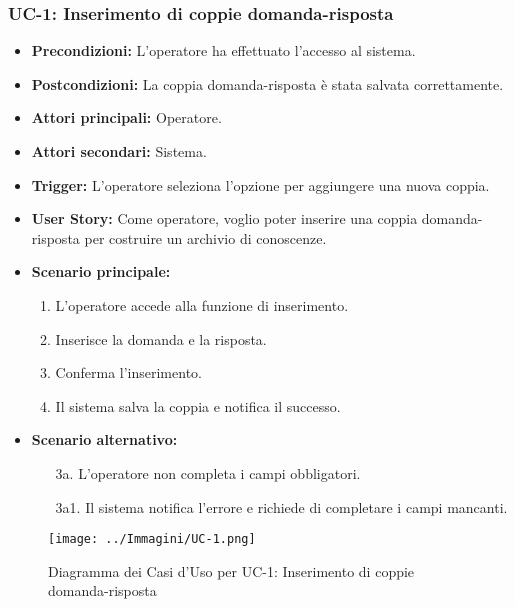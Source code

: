 \documentclass[a4paper, 12pt]{article}
\begin{document}
\subsubsection{UC-1: Inserimento di coppie domanda-risposta}
\begin{itemize}
    \item \textbf{Precondizioni:} L'operatore ha effettuato l'accesso al sistema.
    \item \textbf{Postcondizioni:} La coppia domanda-risposta è stata salvata correttamente.
    \item \textbf{Attori principali:} Operatore.
    \item \textbf{Attori secondari:} Sistema.
    \item \textbf{Trigger:} L'operatore seleziona l'opzione per aggiungere una nuova coppia.
    \item \textbf{User Story:} Come operatore, voglio poter inserire una coppia domanda-risposta per costruire un archivio di conoscenze.
    \item \textbf{Scenario principale:}
    \begin{enumerate}
        \item L'operatore accede alla funzione di inserimento.
        \item Inserisce la domanda e la risposta.
        \item Conferma l'inserimento.
        \item Il sistema salva la coppia e notifica il successo.
    \end{enumerate}
    \item \textbf{Scenario alternativo:}
    \begin{enumerate}
        \item[3a.] L'operatore non completa i campi obbligatori.
        \item[3a1.] Il sistema notifica l'errore e richiede di completare i campi mancanti.
    \end{enumerate}
\end{itemize}
\begin{figure}[hbt!]
    \centering
    \texttt{[image: ../Immagini/UC-1.png]}
    \caption{Diagramma dei Casi d'Uso per UC-1: Inserimento di coppie domanda-risposta}
    \label{fig:uc1-diagram}
\end{figure}
\end{document}
